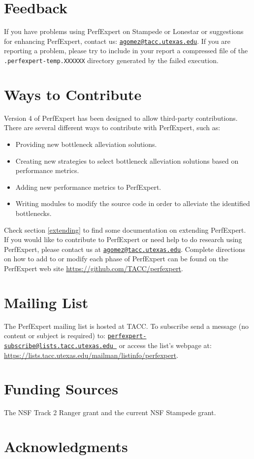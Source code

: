 \section{Feedback}

If you have problems using PerfExpert on Stampede or Lonestar or suggestions for enhancing PerfExpert, contact us: \href{mailto:agomez@tacc.utexas.edu}{\texttt{agomez@tacc.utexas.edu}}. If you are reporting a problem, please try to include in your report a compressed file of the \texttt{.perfexpert-temp.XXXXXX} directory generated by the failed execution.

\section{Ways to Contribute}

Version 4 of PerfExpert has been designed to allow third-party contributions. There are several different ways to contribute with PerfExpert, such as:

\begin{itemize}
	\item Providing new bottleneck alleviation solutions.
	\item Creating new strategies to select bottleneck alleviation solutions based on performance metrics.
	\item Adding new performance metrics to PerfExpert.
	\item Writing modules to modify the source code in order to alleviate the identified bottlenecks.
\end{itemize}

Check section \ref{extending} to find some documentation on extending PerfExpert. If you would like to contribute to PerfExpert or need help to do research using PerfExpert, please contact us at \href{mailto:agomez@tacc.utexas.edu}{\texttt{agomez@tacc.utexas.edu}}. Complete directions on how to add to or modify each phase of PerfExpert can be found on the PerfExpert web site \url{https://github.com/TACC/perfexpert}.

\section{Mailing List}

The PerfExpert mailing list is hosted at TACC. To subscribe send a message (no content or subject is required) to:
\href{mailto:perfexpert-subscribe@lists.tacc.utexas.edu }{\texttt{perfexpert-subscribe@lists.tacc.utexas.edu }} or access the list's webpage at: \url{https://lists.tacc.utexas.edu/mailman/listinfo/perfexpert}.

\section{Funding Sources}

The NSF Track 2 Ranger grant and the current NSF Stampede grant.

\section{Acknowledgments}
